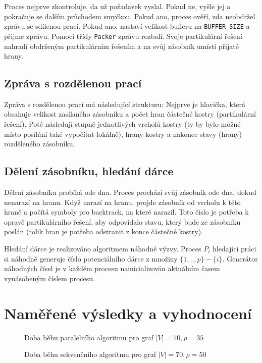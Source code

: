 \documentclass[12pt]{article}
\begin{document}
Proces nejprve zkontroluje, da už požadavek vyslal. Pokud ne, vyšle jej a pokračuje se dalším průchodem smyčkou. Pokud ano, proces ověří, zda neobdržel zprávu se sdílenou prací. Pokud ano, nastaví velikost bufferu na \texttt{BUFFER\_SIZE} a přijme zprávu. Pomocí třídy \texttt{Packer} zprávu rozbalí. Svoje partikulární řešení nahradí obdrženým partikulárním řešením a na svůj zásobník umístí přijaté hrany.

\subsection{Zpráva s rozdělenou prací}
Zpráva s rozdělenou prací má následující strukturu: Nejprve je hlavička, která obsahuje velikost zasílaného zásobníku a počet hran částečné kostry (partikulární řešení). Poté následují stupně jednotlivých vrcholů kostry (ty by bylo možné místo posílání také vypočítat lokálně), hrany kostry a nakonec stavy (hrany) rozděleného zásobníku.

\subsection{Dělení zásobníku, hledání dárce}
Dělení zásobníku probíhá ode dna. Proces prochází svůj zásobník ode dna, dokud nenarazí na hranu. Když narazí na hranu, projde zásobník od vrcholu k této hraně a počítá symboly pro backtrack, na které narazil. Toto číslo je potřeba k opravě partikulárního řešení, aby odpovídalo stavu, který bude ze zásobníku poslán (tolik hran je potřeba odstranit z konce částečné kostry).

Hledání dárce je realizováno algoritmem náhodné výzvy. Proces $P_{i}$ hledající práci si náhodně generuje číslo potenciálního dárce z množiny $\{1, .. ,p\}-\{i\}$. Generátor náhodných čísel je v každém procesu nainicializován aktuálním časem vynásobeným číslem procesu.

\section{Naměřené výsledky a vyhodnocení}

\begin{figure}[ht]
\epsfysize=9cm \centerline{} \caption{Doba běhu paralelního algoritmu pro graf $\vert V \vert = 70, \rho = 35$} \label{seq}
\end{figure}

\begin{figure}[ht]
\epsfysize=9cm \centerline{} \caption{Doba běhu sekvenčního algoritmu pro graf $\vert V \vert = 70, \rho = 50$} \label{seq}
\end{figure}
\end{document}
